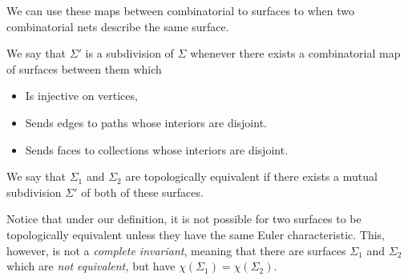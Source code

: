 We can use these maps between combinatorial to surfaces to when two combinatorial nets describe the same surface. 
\begin{definition}
We say that $\Sigma'$ is a subdivision of $\Sigma$ whenever there exists a combinatorial map of surfaces between them which 
\begin{itemize}
\item Is injective on vertices, 
\item Sends edges to paths whose interiors are disjoint.
\item Sends faces to collections whose interiors are disjoint. 
\end{itemize}
\end{definition}

\begin{definition}
We say that $\Sigma_1$ and $\Sigma_2$ are topologically equivalent if there exists a mutual subdivision $\Sigma'$ of both of these surfaces. 
\end{definition}
Notice that under our definition, it is not possible for two surfaces to be topologically equivalent unless they have the same Euler characteristic. This, however, is not a \emph{complete invariant}, meaning that there are surfaces $\Sigma_1$ and $\Sigma_2$ which are \emph{not equivalent,} but have $\chi(\Sigma_1)=\chi(\Sigma_2)$. \\

